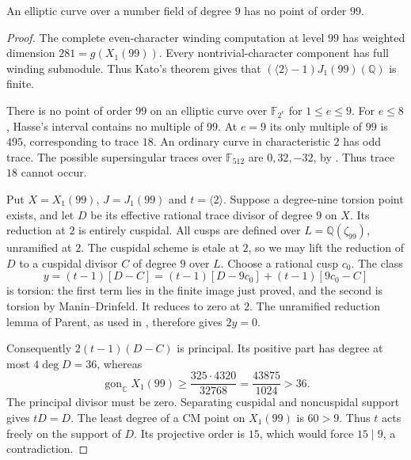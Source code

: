 \begin{proposition}\label{prop:nonic-no99-continuation}
An elliptic curve over a number field of degree $9$ has no point of order $99$.
\end{proposition}
\begin{proof}
The complete even-character winding computation at level $99$ has
weighted dimension $281=g(X_1(99))$. Every nontrivial-character
component has full winding submodule. Thus Kato's theorem gives
that $(\langle2\rangle-1)J_1(99)(\mathbb Q)$ is finite.

There is no point of order $99$ on an elliptic curve over
$\mathbb F_{2^e}$ for $1\leq e\leq9$.
For $e\leq8$, Hasse's interval contains no multiple of $99$.
At $e=9$ its only multiple of $99$ is $495$, corresponding to
trace $18$. An ordinary curve in characteristic $2$ has odd trace.
The possible supersingular traces over $\mathbb F_{512}$ are
$0,32,-32$, by \cite[Theorem~4.6]{DN}. Thus trace $18$ cannot occur.

Put $X=X_1(99)$, $J=J_1(99)$ and $t=\langle2\rangle$.
Suppose a degree-nine torsion point exists, and let $D$ be its
effective rational trace divisor of degree $9$ on $X$.
Its reduction at $2$ is entirely cuspidal.
All cusps are defined over $L=\mathbb Q(\zeta_{99})$, unramified
at $2$. The cuspidal scheme is etale at $2$, so we may lift the
reduction of $D$ to a cuspidal divisor $C$ of degree $9$ over $L$.
Choose a rational cusp $c_0$. The class
\[
 y=(t-1)[D-C]
   =(t-1)[D-9c_0]+(t-1)[9c_0-C]
\]
is torsion: the first term lies in the finite image just proved,
and the second is torsion by Manin--Drinfeld.
It reduces to zero at $2$. The unramified reduction lemma of Parent,
as used in \cite[Section~6.2]{DN}, therefore gives $2y=0$.

Consequently $2(t-1)(D-C)$ is principal. Its positive part has
 degree at most $4\deg D=36$, whereas
\[
 \operatorname{gon}_{\mathbb C}X_1(99)
 \geq\frac{325\cdot4320}{32768}
 =\frac{43875}{1024}>36.
\]
The principal divisor must be zero. Separating cuspidal and
noncuspidal support gives $tD=D$.
The least degree of a CM point on $X_1(99)$ is $60>9$.
Thus $t$ acts freely on the support of $D$. Its projective order
is $15$, which would force $15\mid9$, a contradiction.
\end{proof}
